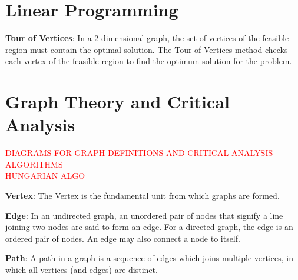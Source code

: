 %
%
%



\section{Linear Programming} \label{Module1:LinearProgramming}

\begin{defn}\label{mod1:defn:TourOfVertices}
	\textbf{Tour of Vertices}: In a 2-dimensional graph, the set of vertices of the feasible region must contain the optimal solution. The Tour of Vertices method checks each vertex of the feasible region to find the optimum solution for the problem.
\end{defn}

\section{Graph Theory and Critical Analysis} \label{Module1:GraphTheoryCriticalAnalysis}

\textcolor{red} {DIAGRAMS FOR GRAPH DEFINITIONS  AND CRITICAL ANALYSIS ALGORITHMS}\\
\textcolor{red}{HUNGARIAN ALGO}
\begin{defn}\label{mod1:defn:Vertex}
   \textbf{Vertex}: The Vertex is the fundamental unit from which graphs are formed.
\end{defn}

\begin{defn}\label{mod1:defn:Edge}
   \textbf{Edge}: In an undirected graph, an unordered pair of nodes that signify  a line joining  two nodes are said to form an edge. For a directed graph, the edge is an ordered pair of nodes. An edge may also connect a node to itself.
\end{defn}

\begin{defn}\label{mod1:defn:Path}
    \textbf{Path}: A path in a graph is a sequence of edges which joins multiple vertices, in which all vertices (and edges) are distinct.
\end{defn}

